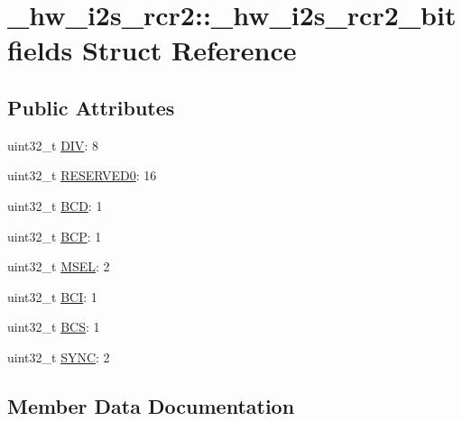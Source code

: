 \hypertarget{struct__hw__i2s__rcr2_1_1__hw__i2s__rcr2__bitfields}{}\section{\+\_\+hw\+\_\+i2s\+\_\+rcr2\+:\+:\+\_\+hw\+\_\+i2s\+\_\+rcr2\+\_\+bitfields Struct Reference}
\label{struct__hw__i2s__rcr2_1_1__hw__i2s__rcr2__bitfields}
\subsection*{Public Attributes}
\begin{DoxyCompactItemize}
\item 
uint32\+\_\+t \hyperlink{struct__hw__i2s__rcr2_1_1__hw__i2s__rcr2__bitfields_a4459f0a39fc0ad6a7daff14b5ac97967}{D\+IV}\+: 8
\item 
uint32\+\_\+t \hyperlink{struct__hw__i2s__rcr2_1_1__hw__i2s__rcr2__bitfields_a41dd71f2ffe8d1e51e3cc1148c4b3b98}{R\+E\+S\+E\+R\+V\+E\+D0}\+: 16
\item 
uint32\+\_\+t \hyperlink{struct__hw__i2s__rcr2_1_1__hw__i2s__rcr2__bitfields_a6034f43009625cd98d5f8a2896d0348e}{B\+CD}\+: 1
\item 
uint32\+\_\+t \hyperlink{struct__hw__i2s__rcr2_1_1__hw__i2s__rcr2__bitfields_aff1a898370c97176b6064087dcccdcae}{B\+CP}\+: 1
\item 
uint32\+\_\+t \hyperlink{struct__hw__i2s__rcr2_1_1__hw__i2s__rcr2__bitfields_a19d2ac06b2a7f695368592a9b1c548b7}{M\+S\+EL}\+: 2
\item 
uint32\+\_\+t \hyperlink{struct__hw__i2s__rcr2_1_1__hw__i2s__rcr2__bitfields_a55ec3fbec48e81d7e35c65d802f804ee}{B\+CI}\+: 1
\item 
uint32\+\_\+t \hyperlink{struct__hw__i2s__rcr2_1_1__hw__i2s__rcr2__bitfields_a60100d7d5303aa9d6ea0ac24a0a0a7c6}{B\+CS}\+: 1
\item 
uint32\+\_\+t \hyperlink{struct__hw__i2s__rcr2_1_1__hw__i2s__rcr2__bitfields_ad7e36a1060950db0f0914b755115879d}{S\+Y\+NC}\+: 2
\end{DoxyCompactItemize}


\subsection{Member Data Documentation}
